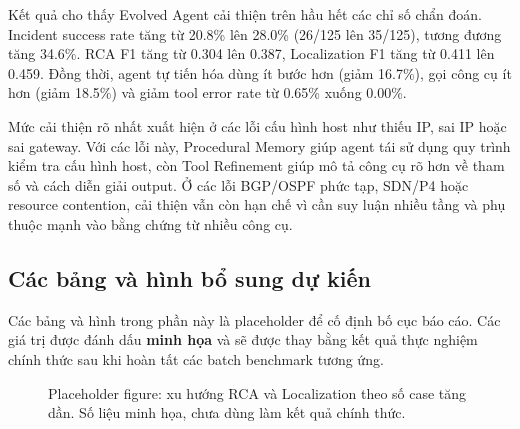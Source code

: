 Kết quả cho thấy Evolved Agent cải thiện trên hầu hết các chỉ số chẩn đoán. Incident success rate tăng từ 20.8\% lên 28.0\% (26/125 lên 35/125), tương đương tăng 34.6\%. RCA F1 tăng từ 0.304 lên 0.387, Localization F1 tăng từ 0.411 lên 0.459. Đồng thời, agent tự tiến hóa dùng ít bước hơn (giảm 16.7\%), gọi công cụ ít hơn (giảm 18.5\%) và giảm tool error rate từ 0.65\% xuống 0.00\%.

Mức cải thiện rõ nhất xuất hiện ở các lỗi cấu hình host như thiếu IP, sai IP hoặc sai gateway. Với các lỗi này, Procedural Memory giúp agent tái sử dụng quy trình kiểm tra cấu hình host, còn Tool Refinement giúp mô tả công cụ rõ hơn về tham số và cách diễn giải output. Ở các lỗi BGP/OSPF phức tạp, SDN/P4 hoặc resource contention, cải thiện vẫn còn hạn chế vì cần suy luận nhiều tầng và phụ thuộc mạnh vào bằng chứng từ nhiều công cụ.

\subsection{Các bảng và hình bổ sung dự kiến}
\label{sec:planned_result_artifacts}

Các bảng và hình trong phần này là placeholder để cố định bố cục báo cáo. Các giá trị được đánh dấu \textbf{minh họa} và sẽ được thay bằng kết quả thực nghiệm chính thức sau khi hoàn tất các batch benchmark tương ứng.

\begin{figure}[htbp]
\centering
{}
\caption{Placeholder figure: xu hướng RCA và Localization theo số case tăng dần. Số liệu minh họa, chưa dùng làm kết quả chính thức.}
\label{fig:cumulative_metrics_placeholder}
\end{figure}

